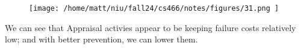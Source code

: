 \documentclass[letterpaper, 11pt]{article}
\newcommand{\1}{\mathds{1}}	%
\theoremstyle{definition}
\begin{document}
\begin{figure}[H]
\centering
\texttt{[image:  /home/matt/niu/fall24/cs466/notes/figures/31.png ]}
\end{figure}
\noindent
We can see that Appraisal activies appear to be keeping failure costs relatively low; and with better prevention, we can lower them. 
\end{document}
